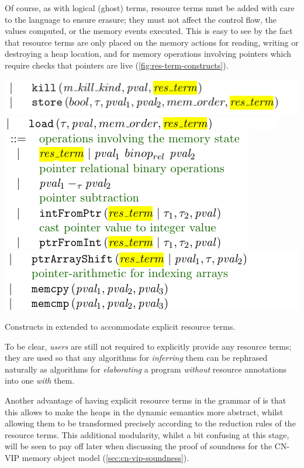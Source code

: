 Of course, as with logical (ghost) terms, resource terms must be added with
care to the language to ensure erasure; they must not affect the control flow,
the values computed, or the memory events executed. This is easy to see by the
fact that resource terms are only placed on the memory actions for reading,
writing or destroying a heap location, and for memory operations involving
pointers which require checks that pointers are live (\cref{fig:res-term-constructs}).

\begin{marginfigure}
    \centering
    \includegraphics{figures/kernel-res-term-1}
    \includegraphics{figures/kernel-res-term-2}
    \includegraphics{figures/kernel-res-term-3}
    \includegraphics{figures/kernel-res-term-4}
    \caption{Constructs in  extended to accommodate
    explicit resource terms.}\label{fig:res-term-constructs}
\end{marginfigure}

To be clear,  \emph{users} are still not required to explicitly provide
any resource terms; they are used so that any algorithms for \emph{inferring}
them can be rephrased naturally as algorithms for \emph{elaborating} a program
\emph{without} resource annotations into one \emph{with} them.

Another advantage of having explicit resource terms in the grammar of
 is that this allows to make the heaps in the dynamic
semantics more abstract, whilst allowing them to be transformed precisely
according to the reduction rules of the resource terms. This additional
modularity, whilst a bit confusing at this stage, will be seen to pay off later
when discussing the proof of soundness for the CN-VIP memory object model
(\cref{sec:cn-vip-soundness}).


